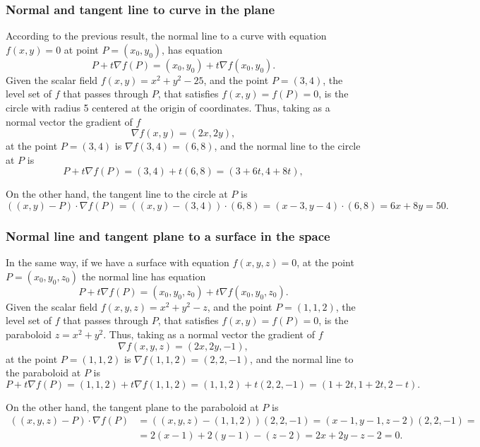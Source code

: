 \begin{frame}
\frametitle{Normal and tangent line to curve in the plane}
According to the previous result, the normal line to a curve with equation $f(x,y)=0$ at point $P=(x_0,y_0)$, has equation
\[
P+t\nabla f(P) = (x_0,y_0)+t\nabla f(x_0,y_0).
\]
Given the scalar field $f(x,y)=x^2+y^2-25$, and the point $P=(3,4)$, the level set of $f$ that passes through $P$, that satisfies $f(x,y)=f(P)=0$, is the circle with radius 5 centered at the origin of coordinates.
Thus, taking as a normal vector the gradient of $f$
\[
\nabla f(x,y) = (2x,2y),
\]
at the point $P=(3,4)$ is $\nabla f(3,4) = (6,8)$, and the normal line to the circle at $P$ is
\[
P+t\nabla f(P) = (3,4)+t(6,8) = (3+6t,4+8t),
\]

On the other hand, the tangent line to the circle at $P$ is
\[
((x,y)-P)\cdot \nabla f(P) = ((x,y)-(3,4))\cdot (6,8) = (x-3,y-4)\cdot(6,8) = 6x+8y=50.
\]
\end{frame}


\begin{frame}
\frametitle{Normal line and tangent plane to a surface in the space}
In the same way, if we have a surface with equation $f(x,y,z)=0$, at the point $P=(x_0,y_0,z_0)$ the normal line has equation
\[
P+t\nabla f(P) = (x_0,y_0,z_0)+t\nabla f(x_0,y_0,z_0).
\]
Given the scalar field $f(x,y,z)=x^2+y^2-z$, and the point $P=(1,1,2)$, the level set of $f$ that passes through $P$, that satisfies $f(x,y)=f(P)=0$, is the paraboloid $z=x^2+y^2$.
Thus, taking as a normal vector the gradient of $f$
\[
\nabla f(x,y,z) = (2x,2y,-1),
\]
at the point $P=(1,1,2)$ is $\nabla f(1,1,2) = (2,2,-1)$, and the normal line to the paraboloid at $P$ is
\[
P+t\nabla f(P) = (1,1,2)+t\nabla f(1,1,2) = (1,1,2)+t(2,2,-1) = (1+2t,1+2t,2-t).
\]

On the other hand, the tangent plane to the paraboloid at $P$ is
\begin{align*}
((x,y,z)-P)\cdot \nabla f(P) &= ((x,y,z)-(1,1,2))(2,2,-1) = (x-1,y-1,z-2)(2,2,-1)=\\
 &= 2(x-1)+2(y-1)-(z-2) = 2x+2y-z-2= 0.
\end{align*}
\end{frame}

%


